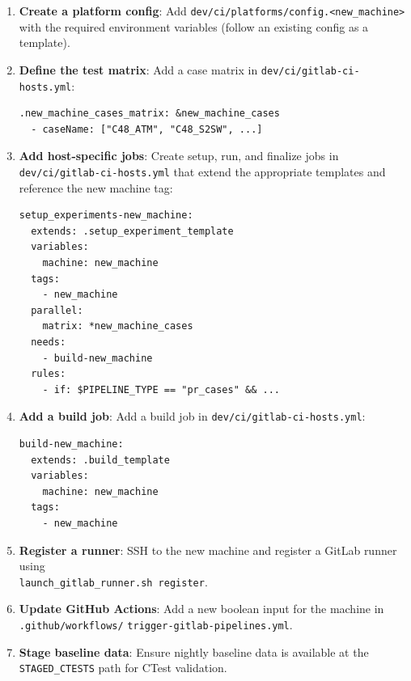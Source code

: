 \documentclass[11pt,letterpaper,twoside]{article}
\begin{document}
\begin{enumerate}[leftmargin=1.5em]
  \item \textbf{Create a platform config}: Add
    \texttt{dev/ci/platforms/config.<new\_machine>} with the required
    environment variables (follow an existing config as a template).

  \item \textbf{Define the test matrix}: Add a case matrix in
    \texttt{dev/ci/gitlab-ci-hosts.yml}:
    \begin{lstlisting}[style=yaml]
.new_machine_cases_matrix: &new_machine_cases
  - caseName: ["C48_ATM", "C48_S2SW", ...]
    \end{lstlisting}

  \item \textbf{Add host-specific jobs}: Create setup, run, and finalize jobs in
    \texttt{dev/ci/gitlab-ci-hosts.yml} that extend the appropriate templates
    and reference the new machine tag:
    \begin{lstlisting}[style=yaml, basicstyle=\ttfamily\footnotesize, xleftmargin=0pt]
setup_experiments-new_machine:
  extends: .setup_experiment_template
  variables:
    machine: new_machine
  tags:
    - new_machine
  parallel:
    matrix: *new_machine_cases
  needs:
    - build-new_machine
  rules:
    - if: $PIPELINE_TYPE == "pr_cases" && ...
    \end{lstlisting}

  \item \textbf{Add a build job}: Add a build job in
    \texttt{dev/ci/gitlab-ci-hosts.yml}:
    \begin{lstlisting}[style=yaml, basicstyle=\ttfamily\footnotesize, xleftmargin=0pt]
build-new_machine:
  extends: .build_template
  variables:
    machine: new_machine
  tags:
    - new_machine
    \end{lstlisting}

  \item \textbf{Register a runner}: SSH to the new machine and register
    a GitLab runner using \\
    \texttt{launch\_gitlab\_runner.sh register}.

  \item \textbf{Update GitHub Actions}: Add a new boolean input for the
    machine in \mbox{\texttt{.github/workflows/}}\linebreak
    \texttt{trigger-gitlab-pipelines.yml}.

  \item \textbf{Stage baseline data}: Ensure nightly baseline data is available
    at the \texttt{STAGED\_CTESTS} path for CTest validation.
\end{enumerate}
\end{document}
